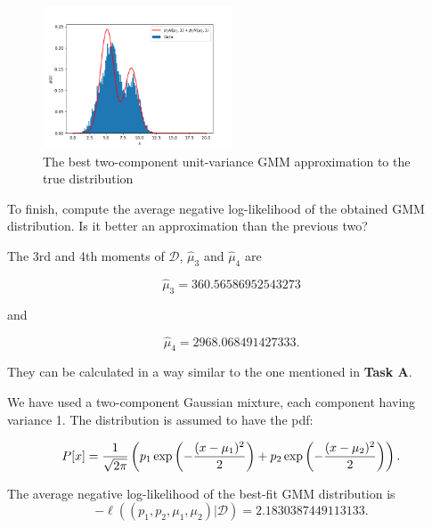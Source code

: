 \begin{tcolorbox}
    \begin{figure}[H]
        \centering
        \includegraphics[width=0.5\textwidth]{assets/images/q3f1.png}
        \caption{The best two-component unit-variance GMM approximation to the
        true distribution}
        \label{fig_q3f1}
    \end{figure}

    To finish, compute the average negative log-likelihood of the obtained GMM
    distribution. Is it better an approximation than the previous two?
\end{tcolorbox}


The 3rd and 4th moments of $\mathcal{D}$, $\hat{\mu}_3$ and $\hat{\mu}_4$ are

\begin{equation*}
    \hat{\mu}_3 = 360.56586952543273
\end{equation*}

and

\begin{equation*}
    \hat{\mu}_4 = 2968.068491427333.
\end{equation*}

They can be calculated in a way similar to the one mentioned in \textbf{Task A}.

We have used a two-component Gaussian mixture, each component having variance 1.
The distribution is assumed to have the pdf:

\begin{equation*}
    P[x]=\frac{1}{\sqrtsign{2\pi}}\left(p_1\exp\left(-\frac
    {(x-\mu_1)^2}{2}\right)+p_2\exp\left(-\frac{(x-\mu_2)^2}{2}\right)\right).
\end{equation*}

The average negative log-likelihood of the best-fit GMM distribution is
\begin{equation*}
    -\ell((p_1, p_2, \mu_1, \mu_2)|\mathcal{D}) = 2.1830387449113133.
\end{equation*}


